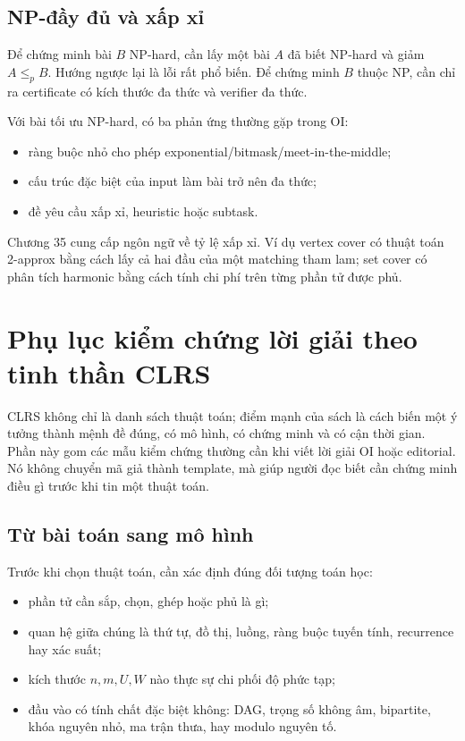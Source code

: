 \documentclass[11pt]{article}
\begin{document}
\subsection{NP-đầy đủ và xấp xỉ}

Để chứng minh bài \(B\) NP-hard, cần lấy một bài \(A\) đã biết NP-hard và giảm
\(A\le_p B\). Hướng ngược lại là lỗi rất phổ biến. Để chứng minh \(B\) thuộc
NP, cần chỉ ra certificate có kích thước đa thức và verifier đa thức.

Với bài tối ưu NP-hard, có ba phản ứng thường gặp trong OI:
\begin{itemize}
  \item ràng buộc nhỏ cho phép exponential/bitmask/meet-in-the-middle;
  \item cấu trúc đặc biệt của input làm bài trở nên đa thức;
  \item đề yêu cầu xấp xỉ, heuristic hoặc subtask.
\end{itemize}
Chương 35 cung cấp ngôn ngữ về tỷ lệ xấp xỉ. Ví dụ vertex cover có thuật toán
2-approx bằng cách lấy cả hai đầu của một matching tham lam; set cover có phân
tích harmonic bằng cách tính chi phí trên từng phần tử được phủ.

\section{Phụ lục kiểm chứng lời giải theo tinh thần CLRS}

CLRS không chỉ là danh sách thuật toán; điểm mạnh của sách là cách biến một ý
tưởng thành mệnh đề đúng, có mô hình, có chứng minh và có cận thời gian. Phần
này gom các mẫu kiểm chứng thường cần khi viết lời giải OI hoặc editorial. Nó
không chuyển mã giả thành template, mà giúp người đọc biết cần chứng minh điều
gì trước khi tin một thuật toán.

\subsection{Từ bài toán sang mô hình}

Trước khi chọn thuật toán, cần xác định đúng đối tượng toán học:
\begin{itemize}
  \item phần tử cần sắp, chọn, ghép hoặc phủ là gì;
  \item quan hệ giữa chúng là thứ tự, đồ thị, luồng, ràng buộc tuyến tính,
        recurrence hay xác suất;
  \item kích thước \(n,m,U,W\) nào thực sự chi phối độ phức tạp;
  \item đầu vào có tính chất đặc biệt không: DAG, trọng số không âm, bipartite,
        khóa nguyên nhỏ, ma trận thưa, hay modulo nguyên tố.
\end{itemize}
\end{document}

